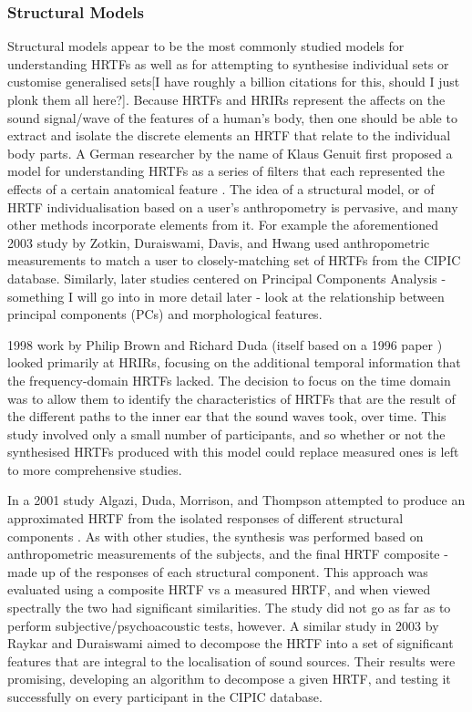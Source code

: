 \subsubsection{Structural Models}
Structural models appear to be the most commonly studied models for understanding HRTFs as well as for attempting to synthesise individual sets or customise generalised sets[I have roughly a billion citations for this, should I just plonk them all here?].  Because HRTFs and HRIRs represent the affects on the sound signal/wave of the features of a human's body, then one should be able to extract and isolate the discrete elements an HRTF that relate to the individual body parts. A German researcher by the name of Klaus Genuit first proposed a model for understanding HRTFs as a series of filters that each represented the effects of a certain anatomical feature \citep{Genuit1984}. The idea of a structural model, or of HRTF individualisation based on a user's anthropometry is pervasive, and many other methods incorporate elements from it. For example the aforementioned 2003 study by Zotkin, Duraiswami, Davis, and Hwang  \citep{Duraiswami2003} used anthropometric measurements to match a user to closely-matching set of HRTFs from the CIPIC database. Similarly, later studies centered on Principal Components Analysis - something I will go into in more detail later - look at the relationship between principal components (PCs) and morphological features. 

1998 work by Philip Brown and Richard Duda \citep{PhillipBrown1998} (itself based on a 1996 paper \citep{lopexmeddis1996}) looked primarily at HRIRs, focusing on the additional temporal information that the frequency-domain HRTFs lacked. The decision to focus on the time domain was to allow them to identify the characteristics of HRTFs that are the result of the different paths to the inner ear that the sound waves took, over time. This study involved only a small number of participants, and so whether or not the synthesised HRTFs produced with this model could replace measured ones is left to more comprehensive studies. 

In a 2001 study Algazi, Duda, Morrison, and Thompson attempted to produce an approximated HRTF from the isolated responses of different structural components \citep{Algazi2001a}. As with other studies, the synthesis was performed based on anthropometric measurements of the subjects, and the final HRTF composite - made up of the responses of each structural component. This approach was evaluated using a composite HRTF vs a measured HRTF, and when viewed spectrally the two had significant similarities. The study did not go as far as to perform subjective/psychoacoustic tests, however. A similar study in 2003 by Raykar and Duraiswami \citep{Raykar2003} aimed to decompose the HRTF into a set of significant features that are integral to the localisation of sound sources. Their results were promising, developing an algorithm to decompose a given HRTF, and testing it successfully on every participant in the CIPIC database. 

